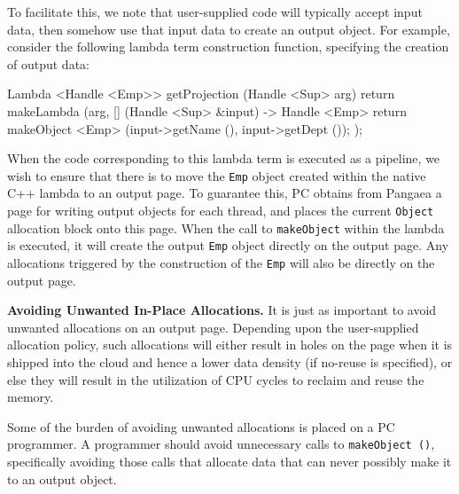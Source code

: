 To facilitate this, we note that user-supplied code will typically accept input data, then somehow use that input data to
create an output object.  For example, consider 
the following lambda term construction function, specifying the creation of output data:

\begin{codesmall}
Lambda <Handle <Emp>> getProjection (Handle <Sup> arg) {
        return makeLambda (arg, [] (Handle <Sup> &input) -> Handle <Emp> {
		return makeObject <Emp> (input->getName (), input->getDept ());
	});}
\end{codesmall}

\noindent
When the code corresponding to this lambda term is executed as a pipeline,
we wish to ensure that there is to move the \texttt{Emp} object created within the native C++ lambda to an output page.
To guarantee this,
PC obtains from Pangaea a page for writing output objects for each thread, and places the current \texttt{Object} allocation block
onto this page. 
When the call to \texttt{makeObject} within the lambda is executed, it will create the output \texttt{Emp} object
directly on the output page.  Any allocations triggered by the construction of the \texttt{Emp} will also be directly on the output page.

\vspace{5 pt}
\noindent
\textbf{Avoiding Unwanted In-Place Allocations.}
It is just as important to avoid unwanted allocations on an output page.  Depending upon the user-supplied
allocation policy, such allocations will either result
in holes on the page when it is shipped into the cloud and hence a lower data density (if no-reuse is specified), 
or else they will result in the utilization of CPU cycles to 
reclaim and reuse the memory. 

Some of the burden of avoiding unwanted allocations is placed on a PC programmer. A programmer should
avoid unnecessary calls to \texttt{makeObject ()}, specifically avoiding those calls that allocate data that can never possibly make it to an output object.

